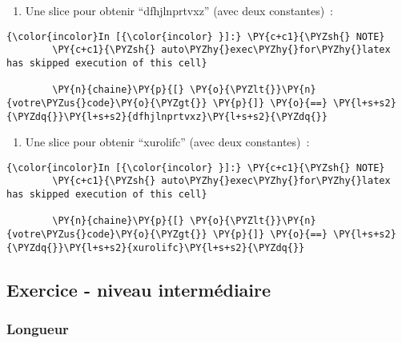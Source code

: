     \begin{enumerate}
\def\labelenumi{\arabic{enumi})}
\setcounter{enumi}{2}
\tightlist
\item
  Une slice pour obtenir ``dfhjlnprtvxz'' (avec deux constantes)~:
\end{enumerate}

    \begin{Verbatim}[commandchars=\\\{\},frame=single,framerule=0.3mm,rulecolor=\color{cellframecolor}]
{\color{incolor}In [{\color{incolor} }]:} \PY{c+c1}{\PYZsh{} NOTE}
        \PY{c+c1}{\PYZsh{} auto\PYZhy{}exec\PYZhy{}for\PYZhy{}latex has skipped execution of this cell}
        
        \PY{n}{chaine}\PY{p}{[} \PY{o}{\PYZlt{}}\PY{n}{votre\PYZus{}code}\PY{o}{\PYZgt{}} \PY{p}{]} \PY{o}{==} \PY{l+s+s2}{\PYZdq{}}\PY{l+s+s2}{dfhjlnprtvxz}\PY{l+s+s2}{\PYZdq{}}
\end{Verbatim}


    \begin{enumerate}
\def\labelenumi{\arabic{enumi})}
\setcounter{enumi}{3}
\tightlist
\item
  Une slice pour obtenir ``xurolifc'' (avec deux constantes)~:
\end{enumerate}

    \begin{Verbatim}[commandchars=\\\{\},frame=single,framerule=0.3mm,rulecolor=\color{cellframecolor}]
{\color{incolor}In [{\color{incolor} }]:} \PY{c+c1}{\PYZsh{} NOTE}
        \PY{c+c1}{\PYZsh{} auto\PYZhy{}exec\PYZhy{}for\PYZhy{}latex has skipped execution of this cell}
        
        \PY{n}{chaine}\PY{p}{[} \PY{o}{\PYZlt{}}\PY{n}{votre\PYZus{}code}\PY{o}{\PYZgt{}} \PY{p}{]} \PY{o}{==} \PY{l+s+s2}{\PYZdq{}}\PY{l+s+s2}{xurolifc}\PY{l+s+s2}{\PYZdq{}}
\end{Verbatim}


    \hypertarget{exercice---niveau-intermuxe9diaire}{%
\subsection{Exercice - niveau
intermédiaire}\label{exercice---niveau-intermuxe9diaire}}

    \hypertarget{longueur}{%
\subsubsection{Longueur}\label{longueur}}

